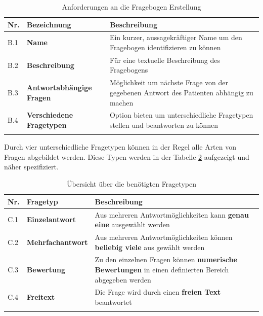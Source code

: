 \begin{table}[htbp]
	\begin{center}
		\begin{tabular}{p{} p{4cm} p{10cm}}
			\rowcolor{black!20} \textbf{Nr.} & \textbf{Bezeichnung} & \textbf{Beschreibung} \\ \toprule 
			B.1 & \textbf{Name} & Ein kurzer, aussagekräftiger Name um den Fragebogen identifizieren zu können \\ \hline \addlinespace
			B.2 & \textbf{Beschreibung} & Für eine textuelle Beschreibung des Fragebogens \\ \hline \addlinespace
			B.3 & \textbf{Antwortabhängige Fragen} & Möglichkeit um nächste Frage von der gegebenen Antwort des Patienten abhängig zu machen \\ \hline \addlinespace
			B.4 & \textbf{Verschiedene Fragetypen} & Option bieten um unterschiedliche Fragetypen stellen und beantworten zu können  \\ \hline \addlinespace
		\end{tabular}
	\end{center}
	\caption[Anforderungen an die Fragebogen Erstellung]{Anforderungen an die Fragebogen Erstellung}
	\label{TabelleFunktionaleAnforderungenFragebogen}
\end{table}

Durch vier unterschiedliche Fragetypen können in der Regel alle Arten von Fragen abgebildet werden. Diese Typen werden in der Tabelle \ref{TabelleFunktionaleAnforderungenFragebogenTypen} aufgezeigt und näher spezifiziert.

\begin{table}[H]
	\begin{center}
		\begin{tabular}{p{} p{4cm} p{10cm}}
			\rowcolor{black!20} \textbf{Nr.} & \textbf{Fragetyp} & \textbf{Beschreibung} \\ \toprule 
			C.1 & \textbf{Einzelantwort} & Aus mehreren Antwortmöglichkeiten kann \textbf{genau eine} ausgewählt werden \\ \hline \addlinespace
			C.2 & \textbf{Mehrfachantwort} & Aus mehreren Antwortmöglichkeiten können \textbf{beliebig viele} aus gewählt werden \\ \hline \addlinespace
			C.3 & \textbf{Bewertung} & Zu den einzelnen Fragen können \textbf{numerische Bewertungen} in einen definierten Bereich abgegeben werden  \\ \hline \addlinespace
			C.4 & \textbf{Freitext} & Die Frage wird durch einen \textbf{freien Text} beantwortet  \\ \hline \addlinespace
		\end{tabular}
	\end{center}
	\caption[Übersicht über die benötigten Fragetypen]{Übersicht über die benötigten Fragetypen}
	\label{TabelleFunktionaleAnforderungenFragebogenTypen}
\end{table}

